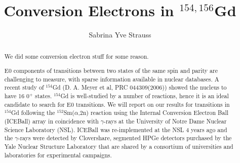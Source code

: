 \documentclass[draft,numrefs,sort&compress,noinfo]{nddiss2e}
\begin{document}
\frontmatter %

\title{Conversion Electrons in $^{154,156}$Gd}
\author{Sabrina Yve Strauss}

\maketitle
%
%

\makecopyright

\begin{abstract}
  We did some conversion electron stuff for some reason.
  
  E0 components of transitions between two states of the same spin and parity are challenging to measure, with sparse information available in nuclear databases. A recent study of $^{154}$Gd (D. A. Meyer et al, PRC 044309(2006)) showed the nucleus to have 16 0$^+$ states. $^{154}$Gd is well-studied by a number of reactions, hence it is an ideal candidate to search for E0 transitions. We will report on our results for transitions in $^{154}$Gd following the $^{152}$Sm($\alpha$,2n) reaction using the Internal Conversion Electron Ball (ICEBall) array in coincidence with $\gamma$-rays at the University of Notre Dame Nuclear Science Laboratory (NSL). ICEBall was re-implemented at the NSL 4 years ago and the $\gamma$-rays were detected by Clovershare, segmented HPGe detectors purchased by the Yale Nuclear Structure Laboratory that are shared by a consortium of universities and laboratories for experimental campaigns.
\end{abstract}
\end{document}
